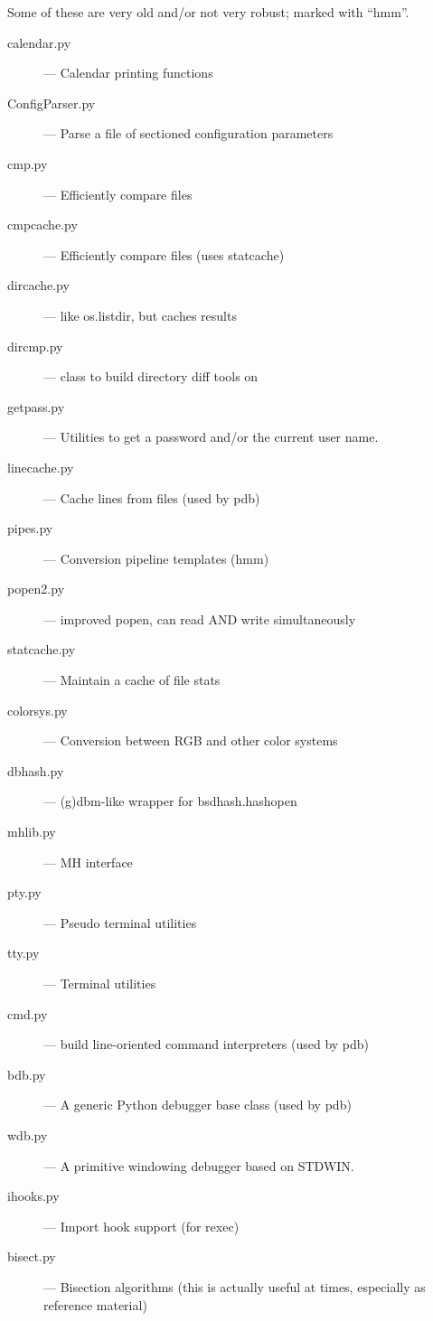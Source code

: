 Some of these are very old and/or not very robust; marked with ``hmm''.

\begin{description}
\item[calendar.py]
--- Calendar printing functions

\item[ConfigParser.py]
--- Parse a file of sectioned configuration parameters

\item[cmp.py]
--- Efficiently compare files

\item[cmpcache.py]
--- Efficiently compare files (uses statcache)

\item[dircache.py]
--- like os.listdir, but caches results

\item[dircmp.py]
--- class to build directory diff tools on

\item[getpass.py]
--- Utilities to get a password and/or the current user name.

\item[linecache.py]
--- Cache lines from files (used by pdb)

\item[pipes.py]
--- Conversion pipeline templates (hmm)

\item[popen2.py]
--- improved popen, can read AND write simultaneously

\item[statcache.py]
--- Maintain a cache of file stats

\item[colorsys.py]
--- Conversion between RGB and other color systems

\item[dbhash.py]
--- (g)dbm-like wrapper for bsdhash.hashopen

\item[mhlib.py]
--- MH interface

\item[pty.py]
--- Pseudo terminal utilities

\item[tty.py]
--- Terminal utilities

\item[cmd.py]
--- build line-oriented command interpreters (used by pdb)

\item[bdb.py]
--- A generic Python debugger base class (used by pdb)

\item[wdb.py]
--- A primitive windowing debugger based on STDWIN.

\item[ihooks.py]
--- Import hook support (for rexec)

\item[bisect.py]
--- Bisection algorithms (this is actually useful at times,
especially as reference material)
\end{description}


